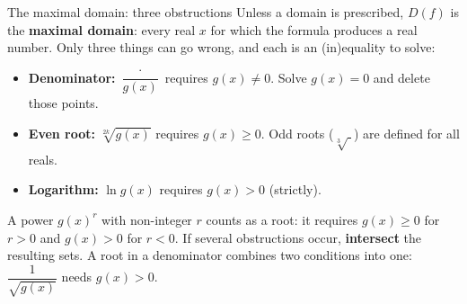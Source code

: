 \begin{gallery}
\hfill
{}\hfill
{}
\gcap{$D=[1,\infty)$, $W=[0,\infty)$ \quad\textbullet\quad
$D=\R$, $W=[0,\infty)$ \quad\textbullet\quad $D=\R$, $W=(0,\infty)$.}
\end{gallery}

\begin{rulebox}{The maximal domain: three obstructions}
Unless a domain is prescribed, $D(f)$ is the \textbf{maximal domain}: every
real $x$ for which the formula produces a real number. Only three things
can go wrong, and each is an (in)equality to solve:
\begin{itemize}[leftmargin=1.6em,itemsep=0.3ex]
  \item \textbf{Denominator:} $\dfrac{\;\cdot\;}{g(x)}$ requires
        $g(x)\neq 0$. Solve $g(x)=0$ and delete those points.
  \item \textbf{Even root:} $\sqrt[2k]{g(x)}$ requires $g(x)\geq 0$.
        Odd roots ($\sqrt[3]{\;}$) are defined for all reals.
  \item \textbf{Logarithm:} $\ln g(x)$ requires $g(x)>0$ (strictly).
\end{itemize}
A power $g(x)^{r}$ with non-integer $r$ counts as a root: it requires
$g(x)\geq 0$ for $r>0$ and $g(x)>0$ for $r<0$. If several obstructions
occur, \textbf{intersect} the resulting sets. A root in a denominator
combines two conditions into one: $\dfrac{1}{\sqrt{g(x)}}$ needs
$g(x)>0$.
\end{rulebox}

